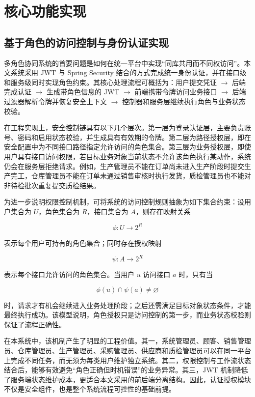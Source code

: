 \chapter{核心功能实现}

\section{基于角色的访问控制与身份认证实现}

多角色协同系统的首要问题是如何在统一平台中实现“同库共用而不同权访问”。本文系统采用 JWT 与 Spring Security 结合的方式完成统一身份认证，并在接口级和服务级同时实现角色约束。其核心处理流程可概括为：用户提交凭证 $\rightarrow$ 后端完成认证 $\rightarrow$ 生成带角色信息的 JWT $\rightarrow$ 前端携带令牌访问业务接口 $\rightarrow$ 后端过滤器解析令牌并恢复安全上下文 $\rightarrow$ 控制器和服务层继续执行角色与业务状态校验。

在工程实现上，安全控制链具有以下几个层次。第一层为登录认证层，主要负责账号、密码和启用状态校验，并生成具有有效期的令牌。第二层为路径授权层，即在安全配置中为不同接口路径指定允许访问的角色集合。第三层为业务授权层，即使用户具有接口访问权限，若目标业务对象当前状态不允许该角色执行某动作，系统仍会在服务层拒绝请求。例如，生产管理员不能在订单尚未进入生产阶段时提交生产完工，仓库管理员不能在订单未通过销售审核时执行发货，质检管理员也不能对非待检批次重复提交质检结果。

为进一步说明权限控制机制，可将系统的访问控制规则抽象为如下集合约束：设用户集合为 $U$，角色集合为 $R$，接口集合为 $A$，则存在映射关系

\begin{equation}
\phi: U \rightarrow 2^{R}
\end{equation}

表示每个用户可持有的角色集合；同时存在授权映射

\begin{equation}
\psi: A \rightarrow 2^{R}
\end{equation}

表示每个接口允许访问的角色集合。当用户 $u$ 访问接口 $a$ 时，只有当

\begin{equation}
\phi(u) \cap \psi(a) \neq \varnothing
\end{equation}

时，请求才有机会继续进入业务处理阶段；之后还需满足目标对象状态条件，才能最终执行成功。该模型说明，角色授权只是访问控制的第一步，而业务状态校验则保证了流程正确性。

在本系统中，该机制产生了明显的工程价值。其一，系统管理员、顾客、销售管理员、仓库管理员、生产管理员、采购管理员、供应商和质检管理员可以在同一平台上完成不同任务，而无须为每类用户维护独立系统。其二，权限控制与工作流状态结合后，能够有效避免“角色正确但时机错误”的业务异常。其三，JWT 机制降低了服务端状态维护成本，更适合本文采用的前后端分离结构。因此，认证授权模块不仅是安全组件，也是整个系统流程可控性的基础前提。

